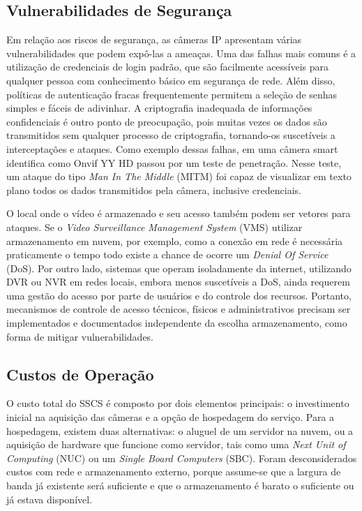\documentclass[12pt, %
openright, 
oneside, %
a4paper,    %
brazil]{facom-ufu-abntex2}
\begin{document}
\subsection{Vulnerabilidades de Segurança}

Em relação aos riscos de segurança, as câmeras IP apresentam várias
vulnerabilidades que podem expô-las a ameaças. Uma das falhas mais comuns é a
utilização de credenciais de login padrão, que são facilmente acessíveis para
qualquer pessoa com conhecimento básico em segurança de rede. Além disso,
políticas de autenticação fracas frequentemente permitem a seleção de senhas
simples e fáceis de adivinhar. A criptografia inadequada de informações
confidenciais é outro ponto de preocupação, pois muitas vezes os dados são
transmitidos sem qualquer processo de criptografia, tornando-os suscetíveis a
interceptações e ataques. Como exemplo dessas falhas, em 
uma câmera smart identifica como Onvif YY HD passou por um teste de penetração.
Nesse teste, um ataque do tipo \textit{Man In The Middle} (MITM) foi capaz de
visualizar em texto plano todos os dados transmitidos pela câmera, inclusive
credenciais.

O local onde o vídeo é armazenado e seu acesso também podem ser vetores para
ataques. Se o \textit{Video Surveillance Management System} (VMS) utilizar
armazenamento em nuvem, por exemplo, como a conexão em rede é necessária
praticamente o tempo todo existe a chance de ocorre um \textit{Denial Of
	Service} (DoS). Por outro lado, sistemas que operam isoladamente da internet,
utilizando DVR ou NVR em redes locais, embora menos suscetíveis a DoS, ainda
requerem uma gestão do acesso por parte de usuários e do controle dos recursos.
Portanto, mecanismos de controle de acesso técnicos, físicos e administrativos
precisam ser implementados e documentados independente da escolha
armazenamento, como forma de mitigar vulnerabilidades.

\subsection{Custos de Operação}

O custo total do SSCS é composto por dois elementos principais: o investimento
inicial na aquisição das câmeras e a opção de hospedagem do serviço. Para a
hospedagem, existem duas alternativas: o aluguel de um servidor na nuvem, ou a
aquisição de hardware que funcione como servidor, tais como uma \textit{Next
	Unit of Computing} (NUC) ou um \textit{Single Board Computers} (SBC). Foram
desconsiderados custos com rede e armazenamento externo, porque assume-se que a
largura de banda já existente será suficiente e que o armazenamento é barato o
suficiente ou já estava disponível.
\end{document}
